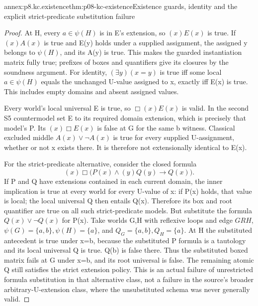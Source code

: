 \begin{annexitem}{annex:p8.kc.existence}{thm:p08-kc-existence}{Existence guards, identity and the explicit strict-predicate substitution failure}
\begin{proof}
At H, every \(a\in\psi(H)\) is in E's extension, so
\((x)E(x)\) is true. If \((x)A(x)\) is true and E(y)
holds under a supplied assignment, the assigned y belongs
to \(\psi(H)\), and its A(y) is true. This makes the
guarded instantiation matrix fully true; prefixes of boxes
and quantifiers give its closures by the soundness argument.
For identity, \((\exists y)(x=y)\) is true iff some local
\(a\in\psi(H)\) equals the unchanged U-value assigned
to x, exactly iff E(x) is true. This includes empty domains
and absent assigned values.

Every world's local universal E is true, so \(\Box(x)E(x)\)
is valid. In the second S5 countermodel set E to its required
domain extension, which is precisely that model's P. Its
\((x)\Box E(x)\) is false at G for the same b witness.
Classical excluded middle \(A(x)\lor\neg A(x)\) is true
for every supplied U-assignment, whether or not x exists there.
It is therefore not extensionally identical to E(x).

For the strict-predicate alternative, consider the closed formula
\[
 (x)\Box\bigl(P(x)\land(y)Q(y)\to Q(x)\bigr).
\]
If P and Q have extensions contained in each current domain,
the inner implication is true at every world for every U-value
of x: if P(x) holds, that value is local; the local universal
Q then entails Q(x). Therefore its box and root quantifier
are true on all such strict-predicate models.
But substitute the formula \(Q(x)\lor\neg Q(x)\) for P(x).
Take worlds G,H with reflexive loops and edge \(GRH\),
\(\psi(G)=\{a,b\},\psi(H)=\{a\}\), and
\(Q_G=\{a,b\},Q_H=\{a\}\). At H the substituted
antecedent is true under x=b, because the substituted P
formula is a tautology and its local universal Q is true.
Q(b) is false there. Thus the substituted boxed matrix fails
at G under x=b, and its root universal is false. The remaining
atomic Q still satisfies the strict extension policy. This
is an actual failure of unrestricted formula substitution in
that alternative class, not a failure in the source's broader
arbitrary-U-extension class, where the unsubstituted schema
was never generally valid.
\end{proof}
\end{annexitem}


